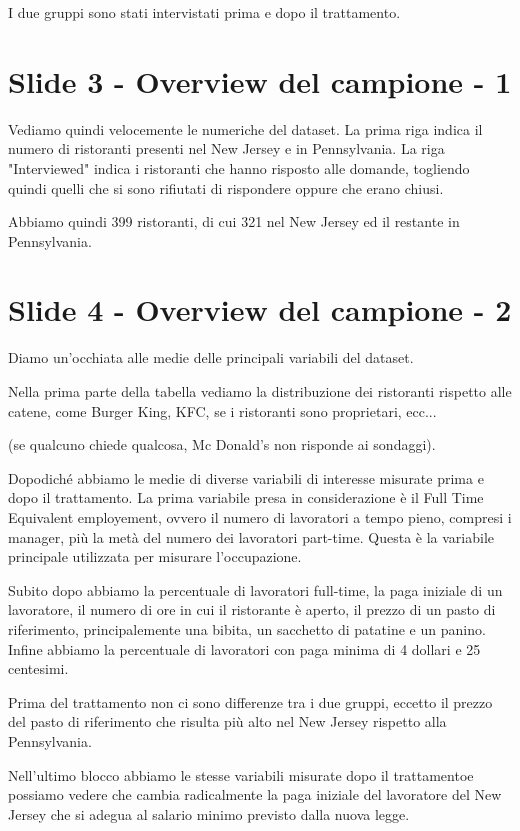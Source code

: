 \documentclass{article}
\begin{document}
I due gruppi sono stati intervistati prima e dopo il trattamento.
\section{Slide 3 - Overview del campione - 1} 

Vediamo quindi velocemente le numeriche del dataset. La prima riga indica il numero di ristoranti presenti nel New Jersey e in Pennsylvania. La riga "Interviewed" indica i ristoranti che hanno risposto alle domande, togliendo quindi quelli che si sono rifiutati di rispondere oppure che erano chiusi.

Abbiamo quindi 399 ristoranti, di cui 321 nel New Jersey ed il restante in Pennsylvania.

 
\section{Slide 4 - Overview del campione - 2}

Diamo un'occhiata alle medie delle principali variabili del dataset. 

Nella prima parte della tabella vediamo la distribuzione dei ristoranti rispetto alle catene, come Burger King, KFC, se i ristoranti sono proprietari, ecc... 

(se qualcuno chiede qualcosa, Mc Donald's non risponde ai sondaggi).

Dopodiché abbiamo le medie di diverse variabili di interesse misurate prima e dopo il trattamento. 
La prima variabile presa in considerazione è il Full Time Equivalent employement, ovvero  il numero di lavoratori a tempo pieno, compresi i manager, più la metà del numero dei lavoratori part-time. Questa è la variabile principale utilizzata per misurare l'occupazione.

Subito dopo abbiamo la percentuale di lavoratori full-time, la paga iniziale di un lavoratore, il numero di ore in cui il ristorante è aperto, il prezzo di un pasto di riferimento, principalemente una bibita, un sacchetto di patatine e un panino. Infine abbiamo la percentuale di lavoratori con paga minima di 4 dollari e 25 centesimi. 

Prima del trattamento non ci sono differenze tra i due gruppi, eccetto il prezzo del pasto di riferimento che risulta più alto nel New Jersey rispetto alla Pennsylvania.

Nell'ultimo blocco abbiamo le stesse variabili misurate dopo il trattamentoe possiamo vedere che cambia radicalmente la paga iniziale del lavoratore del New Jersey che si adegua al salario minimo previsto dalla nuova legge. 
\end{document}
